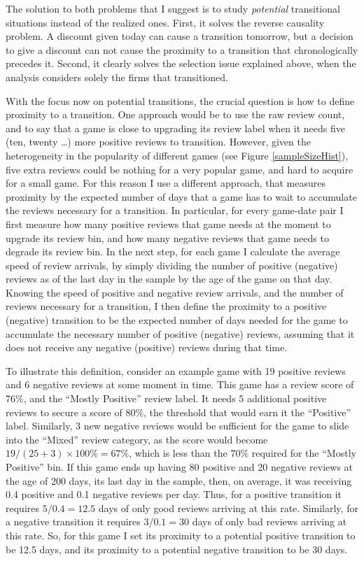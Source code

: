 \documentclass[
  12pt,
  pagebackref]{article}
\begin{document}
The solution to both problems that I suggest is to study
\emph{potential} transitional situations instead of the realized ones.
First, it solves the reverse causality problem. A discount given today
can cause a transition tomorrow, but a decision to give a discount can
not cause the proximity to a transition that chronologically precedes
it. Second, it clearly solves the selection issue explained above, when
the analysis considers solely the firms that transitioned.

With the focus now on potential transitions, the crucial question is how
to define proximity to a transition. One approach would be to use the
raw review count, and to say that a game is close to upgrading its
review label when it needs five (ten, twenty \ldots) more positive
reviews to transition. However, given the heterogeneity in the
popularity of different games (see Figure \ref{sampleSizeHist}), five
extra reviews could be nothing for a very popular game, and hard to
acquire for a small game. For this reason I use a different approach,
that measures proximity by the expected number of days that a game has
to wait to accumulate the reviews necessary for a transition. In
particular, for every game-date pair I first measure how many positive
reviews that game needs at the moment to upgrade its review bin, and how
many negative reviews that game needs to degrade its review bin. In the
next step, for each game I calculate the average speed of review
arrivals, by simply dividing the number of positive (negative) reviews
as of the last day in the sample by the age of the game on that day.
Knowing the speed of positive and negative review arrivals, and the
number of reviews necessary for a transition, I then define the
proximity to a positive (negative) transition to be the expected number
of days needed for the game to accumulate the necessary number of
positive (negative) reviews, assuming that it does not receive any
negative (positive) reviews during that time.

To illustrate this definition, consider an example game with 19 positive
reviews and 6 negative reviews at some moment in time. This game has a
review score of 76\%, and the ``Mostly Positive'' review label. It needs
5 additional positive reviews to secure a score of 80\%, the threshold
that would earn it the ``Positive'' label. Similarly, 3 new negative
reviews would be sufficient for the game to slide into the ``Mixed''
review category, as the score would become
\(19/(25 + 3) \times 100\%= 67\%\), which is less than the \(70\%\)
required for the ``Mostly Positive'' bin. If this game ends up having 80
positive and 20 negative reviews at the age of 200 days, its last day in
the sample, then, on average, it was receiving 0.4 positive and 0.1
negative reviews per day. Thus, for a positive transition it requires
\(5/0.4 = 12.5\) days of only good reviews arriving at this rate.
Similarly, for a negative transition it requires \(3 / 0.1 = 30\) days
of only bad reviews arriving at this rate. So, for this game I set its
proximity to a potential positive transition to be 12.5 days, and its
proximity to a potential negative transition to be 30 days.
\end{document}
